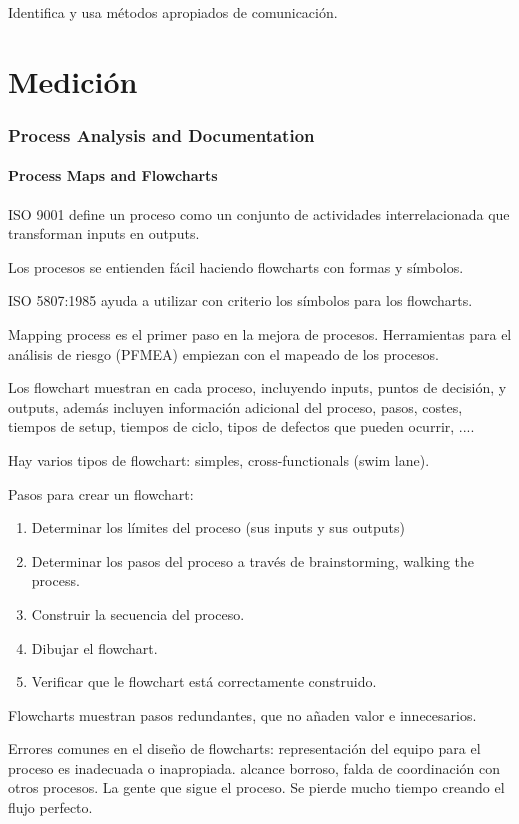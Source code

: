 \documentclass[]{article}
\begin{document}
Identifica y usa métodos apropiados de comunicación.
\pagebreak[4]
\part{Medición}
 
\section{Process Analysis and Documentation}

\subsection{Process Maps and Flowcharts}

ISO 9001 define un proceso como un conjunto de actividades interrelacionada que transforman inputs en outputs.

Los procesos se entienden fácil haciendo flowcharts con formas y símbolos.

ISO 5807:1985 ayuda a utilizar con criterio los símbolos para los flowcharts.

Mapping process es el primer paso en la mejora de procesos. Herramientas para el análisis de riesgo (PFMEA) empiezan con el mapeado de los procesos.

Los flowchart muestran en cada proceso, incluyendo inputs, puntos de decisión, y outputs, además incluyen información adicional del proceso, pasos, costes, tiempos de setup, tiempos de ciclo, tipos de defectos que pueden ocurrir, ....

Hay varios tipos de flowchart: simples, cross-functionals (swim lane).

Pasos para crear un flowchart:

\begin{enumerate}
	\item Determinar los límites del proceso (sus inputs y sus outputs)
	\item Determinar los pasos del proceso a través de brainstorming, walking the process.
	\item Construir la secuencia del proceso.
	\item Dibujar el flowchart.
	\item Verificar que le flowchart está correctamente construido.
\end{enumerate}

Flowcharts muestran pasos redundantes, que no añaden valor e innecesarios. 

Errores comunes en el diseño de flowcharts: representación del equipo para el proceso es inadecuada o inapropiada. alcance borroso, falda de coordinación con otros procesos. La gente que sigue el proceso. Se pierde mucho tiempo creando el flujo perfecto.
\end{document}
